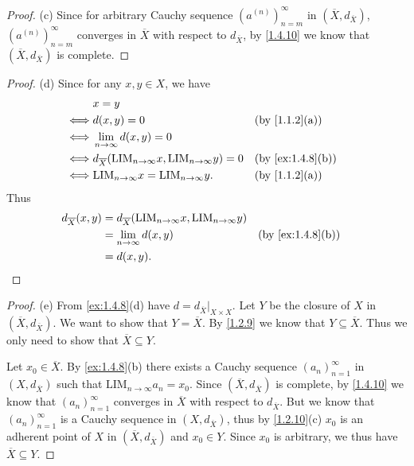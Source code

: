 \begin{proof}{(c)}
  Since for arbitrary Cauchy sequence \((a^{(n)})_{n = m}^\infty\) in \((\overline{X}, d_{\overline{X}})\), \((a^{(n)})_{n = m}^\infty\) converges in \(\overline{X}\) with respect to \(d_{\overline{X}}\), by \cref{1.4.10} we know that \((\overline{X}, d_{\overline{X}})\) is complete.
\end{proof}

\begin{proof}{(d)}
  Since for any \(x, y \in X\), we have
  \begin{align*}
         & x = y                                                                                                              \\
    \iff & d(x, y) = 0                                                                    &  & \text{(by \cref{1.1.2}(a))}    \\
    \iff & \lim_{n \to \infty} d(x, y) = 0                                                                                    \\
    \iff & d_{\overline{X}}(\text{LIM}_{n \to \infty} x, \text{LIM}_{n \to \infty} y) = 0 &  & \text{(by \cref{ex:1.4.8}(b))} \\
    \iff & \text{LIM}_{n \to \infty} x = \text{LIM}_{n \to \infty} y.                     &  & \text{(by \cref{1.1.2}(a))}
  \end{align*}
  Thus
  \begin{align*}
    d_{\overline{X}}(x, y) & = d_{\overline{X}}(\text{LIM}_{n \to \infty} x, \text{LIM}_{n \to \infty} y)                                     \\
                           & = \lim_{n \to \infty} d(x, y)                                                &  & \text{(by \cref{ex:1.4.8}(b))} \\
                           & = d(x, y).
  \end{align*}
\end{proof}

\begin{proof}{(e)}
  From \cref{ex:1.4.8}(d) have \(d = d_{\overline{X}}|_{X \times X}\).
  Let \(Y\) be the closure of \(X\) in \((\overline{X}, d_{\overline{X}})\).
  We want to show that \(Y = \overline{X}\).
  By \cref{1.2.9} we know that \(Y \subseteq \overline{X}\).
  Thus we only need to show that \(\overline{X} \subseteq Y\).

  Let \(x_0 \in \overline{X}\).
  By \cref{ex:1.4.8}(b) there exists a Cauchy sequence \((a_n)_{n = 1}^\infty\) in \((X, d_{\overline{X}})\) such that \(\text{LIM}_{n \to \infty} a_n = x_0\).
  Since \((\overline{X}, d_{\overline{X}})\) is complete, by \cref{1.4.10} we know that \((a_n)_{n = 1}^\infty\) converges in \(\overline{X}\) with respect to \(d_{\overline{X}}\).
  But we know that \((a_n)_{n = 1}^\infty\) is a Cauchy sequence in \((X, d_{\overline{X}})\), thus by \cref{1.2.10}(c) \(x_0\) is an adherent point of \(X\) in \((\overline{X}, d_{\overline{X}})\) and \(x_0 \in Y\).
  Since \(x_0\) is arbitrary, we thus have \(\overline{X} \subseteq Y\).
\end{proof}


